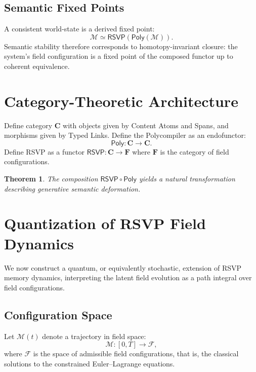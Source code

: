 \documentclass[11pt]{article}
\newtheorem{theorem}{Theorem}[section]
\begin{document}
\subsection{Semantic Fixed Points}

A consistent world-state is a derived fixed point:
\[
\mathcal{M}
\simeq
\mathsf{RSVP}(\mathsf{Poly}(\mathcal{M})).
\]
Semantic stability therefore corresponds to homotopy-invariant closure:
the system's field configuration is a fixed point of the composed functor
up to coherent equivalence.

\section{Category-Theoretic Architecture}
\label{sec:cat}

Define category $\mathbf{C}$ with objects given by Content Atoms and
Spans, and morphisms given by Typed Links.
Define the Polycompiler as an endofunctor:
\[
\mathsf{Poly}: \mathbf{C}\to\mathbf{C}.
\]
Define RSVP as a functor $\mathsf{RSVP}: \mathbf{C}\to\mathbf{F}$
where $\mathbf{F}$ is the category of field configurations.

\begin{theorem}
The composition $\mathsf{RSVP}\circ \mathsf{Poly}$ yields a natural
transformation describing generative semantic deformation.
\end{theorem}

\section{Quantization of RSVP Field Dynamics}
\label{sec:quantization}

We now construct a quantum, or equivalently stochastic, extension of RSVP
memory dynamics, interpreting the latent field evolution as a path integral
over field configurations.

\subsection{Configuration Space}

Let $\mathcal{M}(t)$ denote a trajectory in field space:
\[
\mathcal{M} : [0,T] \to \mathcal{F},
\]
where $\mathcal{F}$ is the space of admissible field configurations, that is,
the classical solutions to the constrained Euler--Lagrange equations.
\end{document}
